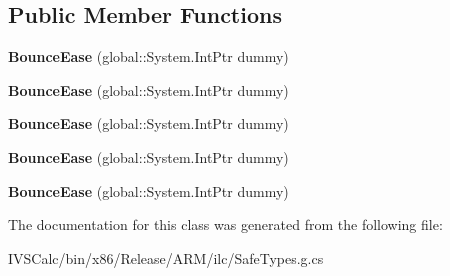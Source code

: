 \subsection*{Public Member Functions}
\begin{DoxyCompactItemize}
\item 
\mbox{\label{class_windows_1_1_u_i_1_1_xaml_1_1_media_1_1_animation_1_1_bounce_ease_aa30ae335f7473374ece2d60e45708804}} 
{\bfseries Bounce\+Ease} (global\+::\+System.\+Int\+Ptr dummy)
\item 
\mbox{\label{class_windows_1_1_u_i_1_1_xaml_1_1_media_1_1_animation_1_1_bounce_ease_aa30ae335f7473374ece2d60e45708804}} 
{\bfseries Bounce\+Ease} (global\+::\+System.\+Int\+Ptr dummy)
\item 
\mbox{\label{class_windows_1_1_u_i_1_1_xaml_1_1_media_1_1_animation_1_1_bounce_ease_aa30ae335f7473374ece2d60e45708804}} 
{\bfseries Bounce\+Ease} (global\+::\+System.\+Int\+Ptr dummy)
\item 
\mbox{\label{class_windows_1_1_u_i_1_1_xaml_1_1_media_1_1_animation_1_1_bounce_ease_aa30ae335f7473374ece2d60e45708804}} 
{\bfseries Bounce\+Ease} (global\+::\+System.\+Int\+Ptr dummy)
\item 
\mbox{\label{class_windows_1_1_u_i_1_1_xaml_1_1_media_1_1_animation_1_1_bounce_ease_aa30ae335f7473374ece2d60e45708804}} 
{\bfseries Bounce\+Ease} (global\+::\+System.\+Int\+Ptr dummy)
\end{DoxyCompactItemize}


The documentation for this class was generated from the following file\+:\begin{DoxyCompactItemize}
\item 
I\+V\+S\+Calc/bin/x86/\+Release/\+A\+R\+M/ilc/Safe\+Types.\+g.\+cs\end{DoxyCompactItemize}

